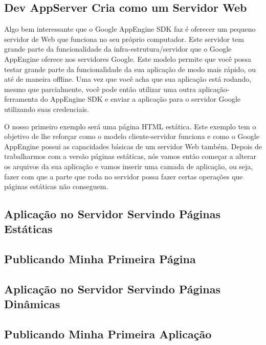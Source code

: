 \documentclass[a4paper]{article}
\begin{document}
\subsection {Dev AppServer Cria como um Servidor Web } 

Algo bem interessante que o Google AppEngine SDK faz é oferecer um pequeno servidor de Web que funciona no seu próprio computador. Este servidor tem grande parte da funcionalidade da infra-estrutura/servidor que o Google AppEngine oferece nos servidores Google. Este modelo permite que você possa testar grande parte da funcionalidade da sua aplicação de modo mais rápido, ou até de maneira offline. Uma vez que você acha que sua aplicação está rodando, mesmo que parcialmente, você pode então utilizar uma outra aplicação-ferramenta do AppEngine SDK e enviar a aplicação para o servidor Google utilizando suas credenciais.

O nosso primeiro exemplo será uma página HTML estática. Este exemplo tem o objetivo de lhe reforçar como o modelo cliente-servidor funciona e como o Google AppEngine possui as capacidades básicas de um servidor Web também. Depois de trabalharmos com a versão páginas estáticas, nós vamos então começar a alterar os arquivos da sua aplicação e vamos inserir uma camada de aplicação, ou seja, fazer com que a parte que roda no servidor possa fazer certas operações que páginas estáticas não conseguem. 

\subsection {Aplicação no Servidor Servindo Páginas Estáticas} 


\subsection { Publicando Minha Primeira Página } 


\subsection {Aplicação no Servidor Servindo Páginas Dinâmicas} 


\subsection { Publicando Minha Primeira Aplicação } 


\printindex
\end{document}
